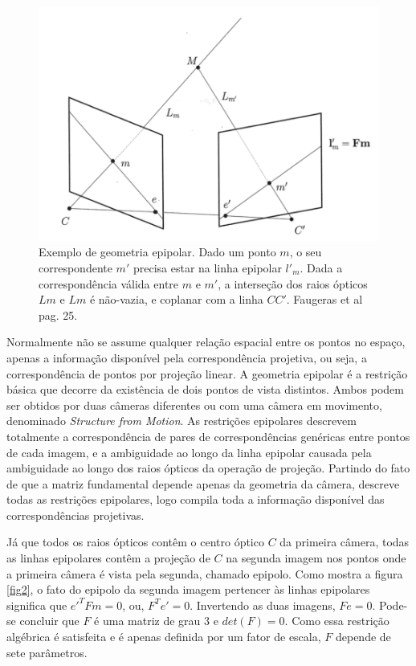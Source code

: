 \begin{figure}
	\centering
		\includegraphics{Imagens/figura2-4.png}
	\caption{Exemplo de geometria epipolar. Dado um ponto $m$, o seu correspondente $m'$ precisa estar na linha epipolar $l'_{m}$. Dada a correspondência válida entre $m$ e $m'$, a interseção dos raios ópticos $Lm$ e $Lm$ é não-vazia, e coplanar com a linha $CC'$. Faugeras et al \cite{Faugeras-Geometry} pag. 25.}
	\label{fig4}
\end{figure}

Normalmente não se assume qualquer relação espacial entre os pontos no espaço, apenas a informação disponível pela correspondência projetiva, ou seja, a correspondência de pontos por projeção linear. A geometria epipolar é a restrição básica que decorre da existência de dois pontos de vista distintos. Ambos podem ser obtidos por duas câmeras diferentes ou com uma câmera em movimento, denominado \textit{Structure from Motion}. As restrições epipolares descrevem totalmente a correspondência de pares de correspondências genéricas entre pontos de cada imagem, e a ambiguidade ao longo da linha epipolar causada pela ambiguidade ao longo dos raios ópticos da operação de projeção. Partindo do fato de que a matriz fundamental depende apenas da geometria da câmera, descreve todas as restrições epipolares, logo compila toda a informação disponível das correspondências projetivas. 

Já que todos os raios ópticos contêm o centro óptico $C$ da primeira câmera, todas as linhas epipolares contêm a projeção de $C$ na segunda imagem nos pontos onde a primeira câmera é vista pela segunda, chamado epipolo. Como mostra a figura \ref{fig2}, o fato do epipolo da segunda imagem pertencer às linhas epipolares significa que $e'^{T}Fm = 0$, ou, $F^{T}e' = 0$. Invertendo as duas imagens, $Fe = 0$. Pode-se concluir que $F$ é uma matriz de grau 3 e $det(F) = 0$. Como essa restrição algébrica é satisfeita e é apenas definida por um fator de escala, $F$ depende de sete parâmetros.


